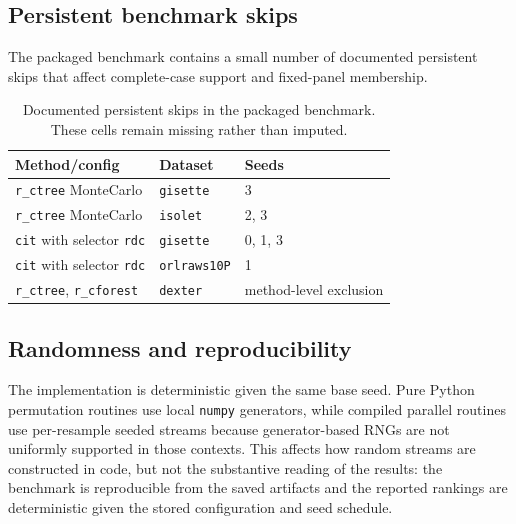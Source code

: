 \subsection{Persistent benchmark skips}

The packaged benchmark contains a small number of documented persistent skips
that affect complete-case support and fixed-panel membership.

\begin{table}[t]
  \centering
  \scriptsize
  \setlength{\tabcolsep}{4pt}
  \begin{tabular}{@{}lll@{}}
    \toprule
    Method/config & Dataset & Seeds \\
    \midrule
    \texttt{r\_ctree} MonteCarlo & \texttt{gisette} & 3 \\
    \texttt{r\_ctree} MonteCarlo & \texttt{isolet} & 2, 3 \\
    \texttt{cit} with selector \texttt{rdc} & \texttt{gisette} & 0, 1, 3 \\
    \texttt{cit} with selector \texttt{rdc} & \texttt{orlraws10P} & 1 \\
    \texttt{r\_ctree}, \texttt{r\_cforest} & \texttt{dexter} & method-level exclusion \\
    \bottomrule
  \end{tabular}
  \caption{Documented persistent skips in the packaged benchmark. These cells
  remain missing rather than imputed.}
  \label{tab:implementation-skips}
\end{table}

\subsection{Randomness and reproducibility}

The implementation is deterministic given the same base seed. Pure Python
permutation routines use local \texttt{numpy} generators, while compiled
parallel routines use per-resample seeded streams because generator-based RNGs
are not uniformly supported in those contexts. This affects how random streams
are constructed in code, but not the substantive reading of the results: the
benchmark is reproducible from the saved artifacts and the reported rankings are
deterministic given the stored configuration and seed schedule.
